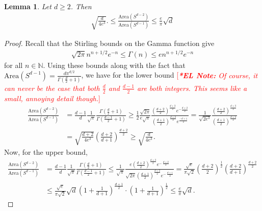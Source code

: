 \documentclass[journal,onecolumn,11pt,final]{IEEEtran}
\newcommand{\1}{\mathbb{1}}
\newcommand{\N}{\mathbb{N}}
\theoremstyle{plain}
\theoremstyle{definition}
\theoremstyle{plain}
\theoremstyle{plain}
\newtheorem{lemma}[theorem]{Lemma}
\theoremstyle{definition}
\newcommand{\ELnote}[1]{\textcolor{red}{[{\em {\bf **EL Note:} #1}]}}
\renewcommand{\N}{\mathbb{N}}
\begin{document}
\begin{lemma} \label{lem: ratio of spherical areas}
	Let \(d \geq 2\). Then 
	\begin{align*}
		\sqrt{ \frac{d}{4e^3} }. \leq  \frac{\mathrm{Area}(S^{d-2})}{\mathrm{Area}(S^{d-1})} \leq \frac{e}{\pi} \sqrt{d}
	\end{align*}
\end{lemma}
\begin{proof}
	Recall that the Stirling bounds on the Gamma function give
	\begin{align*}
		\sqrt{2\pi} n^{n+1/2} e^{-n} \leq \Gamma(n) \leq e n^{n+1/2} e^{-n}
	\end{align*}
	for all \(n \in \N\). Using these bounds along with the fact that \(\mathrm{Area}(S^{d-1}) = \frac{d \pi^{d/2}}{\Gamma\left( \frac{d}{2} + 1\right)}\), we have for the lower bound \ELnote{Of course, it can never be the case that both \( \frac{d}{2}\) and \(\frac{d-1}{2}\) are both integers. This seems like a small, annoying detail though.}
	\begin{align*}
		\frac{\mathrm{Area}(S^{d-2})}{\mathrm{Area}(S^{d-1})} 
		&= \frac{d-1}{d} \frac{1}{\sqrt{\pi}} \frac{\Gamma\left( \frac{d}{2} + 1\right)}{\Gamma\left( \frac{d-1}{2} + 1\right)}
		\geq \frac{1}{2} \frac{\sqrt{2\pi}}{e\sqrt{\pi}} \frac{(\frac{d+2}{2})^{\frac{d+3}{2}} e^{-\frac{d+2}{2}}}{(\frac{d+1}{2})^{\frac{d+2}{2}}e^\frac{-d+1}{2}}
		=  \frac{1}{\sqrt{2e^3}} \frac{(\frac{d+2}{2})^{\frac{d+3}{2}}}{(\frac{d+1}{2})^{\frac{d+2}{2}}}\\
		&= \sqrt{\frac{d+2}{4e^3}} \left(\frac{d+2}{d+1}\right)^{\frac{d+2}{2}} 
		\geq \sqrt{\frac{d}{4e^3}} .
	\end{align*}
	Now, for the upper bound,
	\begin{align*}
		\frac{\mathrm{Area}(S^{d-2})}{\mathrm{Area}(S^{d-1})}
		&= \frac{d-1}{d} \frac{1}{\sqrt{\pi}} \frac{\Gamma\left( \frac{d}{2} + 1\right)}{\Gamma\left( \frac{d-1}{2} + 1\right)}
		\leq \frac{1}{\sqrt{\pi}} \frac{e \left(\frac{d+2}{2} \right)^{\frac{d+3}{2}} e^{- \,  \frac{d+2}{2} }}{\sqrt{2\pi} \left( \frac{d+1}{2} \right)^{\frac{d+2}{2}} e^{- \, \frac{d+1}{2}}}
		= \frac{\sqrt{e}}{\pi \sqrt{2}} \left( \frac{d+2}{2} \right)^{\frac{1}{2}} \left( \frac{d+2}{d+1} \right)^{\frac{d+2}{2}}\\
		&\leq  \frac{\sqrt{e}}{\pi \sqrt{2}} \sqrt{d} \left( 1 + \frac{1}{d+1} \right)^{\frac{d+1}{2}} \cdot  \left( 1 + \frac{1}{d+1} \right)^{\frac{1}{2}}
		\leq \frac{e}{\pi} \sqrt{d}.
	\end{align*}
\end{proof}
\end{document}
